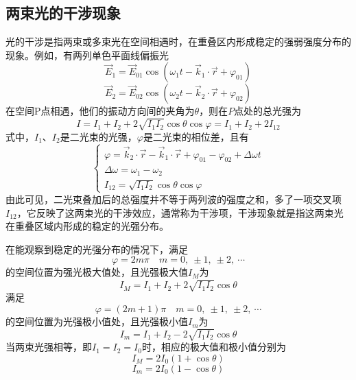 \documentclass[cn,10pt,chinesefont=founder,math=mtpro2,cite=super,toc=onecol,twoside,openany]{elegantbook}
\begin{document}
\subsection{两束光的干涉现象}
光的干涉是指两束或多束光在空间相遇时，在重叠区内形成稳定的强弱强度分布的现象。例如，有两列单色平面线偏振光
\begin{equation}
\vec{E}_1=\vec{E}_{01}\cos(\omega_1t-\vec{k}_1\cdot\vec{r}+\varphi_{01})
\end{equation}
\begin{equation}
\vec{E}_2=\vec{E}_{02}\cos(\omega_2t-\vec{k}_2\cdot\vec{r}+\varphi_{02})
\end{equation}
在空间P点相遇，他们的振动方向间的夹角为$\theta$，则在$P$点处的总光强为
\begin{equation}
I=I_1+I_2+2\sqrt{I_1I_2}\cos\theta\cos\varphi=I_1+I_2+2I_{12}
\label{eq:two-light-intensity-distribution}
\end{equation}
式中，$I_1$、$I_2$是二光束的光强，$\varphi$是二光束的相位差，且有
\begin{equation}
\begin{cases}
\varphi=\vec{k}_2\cdot\vec{r}-\vec{k}_1\cdot\vec{r}+\varphi_{01}-\varphi_{02}+\Delta\omega t\\
\Delta\omega=\omega_1-\omega_2\\
I_{12}=\sqrt{I_1I_2}\cos\theta\cos\varphi
\end{cases}
\end{equation}
由此可见，二光束叠加后的总强度并不等于两列波的强度之和，多了一项交叉项$I_{12}$，它反映了这两束光的干涉效应，通常称为干涉项，干涉现象就是指这两束光在重叠区域内形成的稳定的光强分布。

在能观察到稳定的光强分布的情况下，满足
\begin{equation}
\varphi=2m\pi\quad m=0,\ \pm1,\ \pm2,\ \cdots
\end{equation}
的空间位置为强光极大值处，且光强极大值$I_M$为
\begin{equation}
I_M=I_1+I_2+2\sqrt{I_1I_2}\cos\theta
\end{equation}
满足
\begin{equation}
\varphi=(2m+1)\pi\quad m=0,\ \pm1,\ \pm2,\ \cdots
\end{equation}
的空间位置为光强极小值处，且光强极小值$I_m$为
\begin{equation}
I_m=I_1+I_2-2\sqrt{I_1I_2}\cos\theta
\end{equation}
当两束光强相等，即$I_1=I_2=I_0$时，相应的极大值和极小值分别为
\begin{equation}
I_M=2I_0(1+\cos\theta)
\label{eq:two-light-intensity-distribution-max}
\end{equation}
\begin{equation}
I_m=2I_0(1-\cos\theta)
\label{eq:two-light-intensity-distribution-min}
\end{equation}
\end{document}
